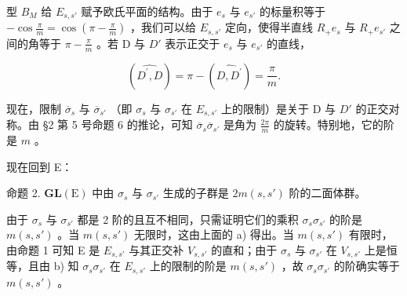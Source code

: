 型 \(B_{M}\) 给 \(E_{s,s'}\) 赋予欧氏平面的结构。由于 \(e_{s}\) 与 \(e_{s'}\) 的标量积等于 \(-\cos\frac{\pi}{m}=\cos\left(\pi-\frac{\pi}{m}\right)\) ，我们可以给 \(E_{s,s'}\) 定向，使得半直线 \(R_{+}e_{s}\) 与 \(R_{+}e_{s'}\) 之间的角等于 \(\pi-\frac{\pi}{m}\) 。若 D 与 \(D'\) 表示正交于 \(e_{s}\) 与 \(e_{s'}\) 的直线，

\[
(\widehat {D ^ {\prime} , D}) = \pi - (\widehat {D , D ^ {\prime}}) = \frac {\pi}{m}.
\]

现在，限制 \(\overline{\sigma}_s\) 与 \(\overline{\sigma}_{s'}\) （即 \(\sigma_s\) 与 \(\sigma_{s'}\) 在 \(E_{s,s'}\) 上的限制）是关于 D 与 \(D'\) 的正交对称。由 §2 第 5 号命题 6 的推论，可知 \(\overline{\sigma}_s\overline{\sigma}_{s'}\) 是角为 \(\frac{2\pi}{m}\) 的旋转。特别地，它的阶是 \(m\) 。

现在回到 E：

命题 2. \(\mathbf{GL}(\mathrm{E})\) 中由 \(\sigma_s\) 与 \(\sigma_{s'}\) 生成的子群是 \(2m(s,s')\) 阶的二面体群。

由于 \(\sigma_s\) 与 \(\sigma_{s'}\) 都是 2 阶的且互不相同，只需证明它们的乘积 \(\sigma_s\sigma_{s'}\) 的阶是 \(m(s,s')\) 。当 \(m(s,s')\) 无限时，这由上面的 a) 得出。当 \(m(s, s')\) 有限时，由命题 1 可知 E 是 \(E_{s,s'}\) 与其正交补 \(V_{s,s'}\) 的直和；由于 \(\sigma_s\) 与 \(\sigma_{s'}\) 在 \(V_{s,s'}\) 上是恒等，且由 b) 知 \(\sigma_s\sigma_{s'}\) 在 \(E_{s,s'}\) 上的限制的阶是 \(m(s, s')\) ，故 \(\sigma_s\sigma_{s'}\) 的阶确实等于 \(m(s, s')\) 。

